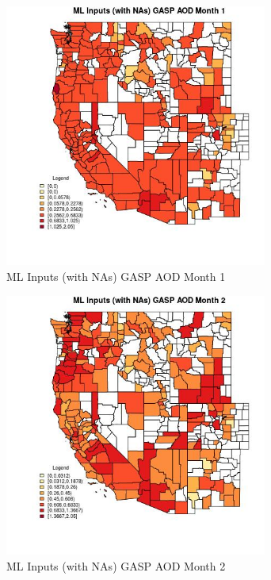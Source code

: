 \begin{figure} 
\centering  
\includegraphics[width=0.77\textwidth]{Code_Outputs/Report_ML_input_PM25_Step4_part_e_de_duplicated_aves_compiled_2019-05-21wNAs_CountyGASP_AODmedianMonth1.jpg} 
\caption{\label{fig:Report_ML_input_PM25_Step4_part_e_de_duplicated_aves_compiled_2019-05-21wNAsCountyGASP_AODmedianMonth1}ML Inputs (with NAs) GASP AOD Month 1} 
\end{figure} 
 

\begin{figure} 
\centering  
\includegraphics[width=0.77\textwidth]{Code_Outputs/Report_ML_input_PM25_Step4_part_e_de_duplicated_aves_compiled_2019-05-21wNAs_CountyGASP_AODmedianMonth2.jpg} 
\caption{\label{fig:Report_ML_input_PM25_Step4_part_e_de_duplicated_aves_compiled_2019-05-21wNAsCountyGASP_AODmedianMonth2}ML Inputs (with NAs) GASP AOD Month 2} 
\end{figure} 
 

